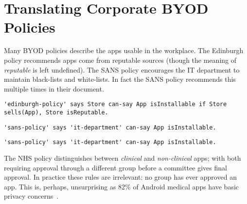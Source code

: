 \documentclass{easychair}
\begin{document}
\section{Translating Corporate BYOD Policies}
\label{sec:translation}

Many BYOD policies describe the apps usable in the workplace.
The Edinburgh policy recommends apps come from reputable sources (though the meaning of \emph{reputable} is left undefined). 
The SANS policy encourages the IT department to maintain black-lists and white-lists.
In fact the SANS policy recommends this multiple times in their document.
\begin{lstlisting}[title={\footnotesize\textbf{Edinburgh}:~\itshape ``Only download applications (‘apps’) or other software from reputable sources.''}]
'edinburgh-policy' says Store can-say App isInstallable if Store sells(App), Store isReputable.
\end{lstlisting}
\begin{lstlisting}[title={\footnotesize\textbf{SANS}:~\itshape ``The IT Department maintains a list of allowed and unauthorised applications and makes them available to users on the intranet.''}]
'sans-policy' says 'it-department' can-say App isInstallable.
\end{lstlisting}
\begin{lstlisting}[title={\footnotesize\textbf{SANS}:~\itshape ``Only approved third party applications can be
installed on handhelds. The approved list can be
obtained by contacting the IT department, or should be
available on the intranet.''}]
'sans-policy' says 'it-department' can-say App isInstallable.
\end{lstlisting}
The NHS policy distinguishes between \emph{clinical} and \emph{non-clinical} apps;
    with both requiring approval through a different group before a committee gives final approval.
In practice these rules are irrelevant: no group has ever approved an app. 
This is, perhaps, unsurprising as 82\% of Android medical apps have basic privacy concerns~\cite{Blenner:2016ja,Knorr:2015st}.
\end{document}
